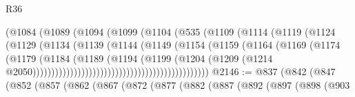 \begin{lexlean}{R36}
\begin{coremodule}
                                          (@1084
                                            (@1089
                                              (@1094
                                                (@1099
                                                  (@1104
                                                    (@535
                                                      (@1109
                                                        (@1114
                                                          (@1119
                                                            (@1124
                                                              (@1129
                                                                (@1134
                                                                  (@1139
                                                                    (@1144
                                                                      (@1149
                                                                        (@1154
                                                                          (@1159
                                                                            (@1164
                                                                              (@1169
                                                                                (@1174
                                                                                  (@1179
                                                                                    (@1184
                                                                                      (@1189
                                                                                        (@1194
                                                                                          (@1199
                                                                                            (@1204
                                                                                              (@1209
                                                                                                (@1214
                                                                                                  @2050)))))))))))))))))))))))))))))))))))))))))))))))
@2146 := @837
    (@842
      (@847
        (@852
          (@857
            (@862
              (@867
                (@872
                  (@877
                    (@882
                      (@887
                        (@892
                          (@897
                            (@898
                              (@903

\end{coremodule}
\end{lexlean}

